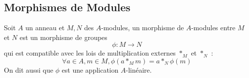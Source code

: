 \documentclass[../main.tex]{subfiles}
\begin{document}

\subsection{Morphismes de Modules}
\begin{defn}\label{defn:morhpismes_de_module}
	Soit $A$ un anneau et $M,N$ des $A$-modules, un morphisme de $A$-modules entre $M$ et $N$ est un morphisme de groupes
	\[ 
	\phi: M \to N
	\]
	qui est compatible avec les lois de multiplication externes $\ast_M$ et $\ast_N$ :
	\[ 
		\forall a \in A, m \in M, \phi(a \ast_M m) = a \ast_N \phi(m)
	\]
	On dit aussi que $\phi$ est une application $A$-linéaire.
	
\end{defn}
\end{document}
